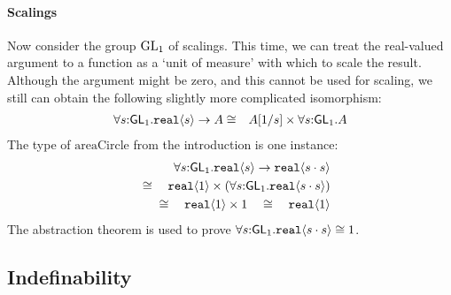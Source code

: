 \paragraph{Scalings}
Now consider the group $\mathrm{GL}_1$ of scalings. This time, we can treat
the real-valued argument to a function as a `unit of measure' with
which to scale the result. 
Although the argument might be zero, and this cannot be used for scaling,
we still can obtain the following slightly more complicated
isomorphism:
\begin{eqnarray*}
\forall s\mathord:\mathsf{GL}_1.\textup{\texttt{real}}\langle s \rangle\to A
& \cong &
A[1/s]\times \forall s\mathord:\mathsf{GL}_1.A
\end{eqnarray*}
The type of $\mathrm{areaCircle}$ from the introduction is one instance:
\begin{eqnarray*}
\forall s\mathord:\mathsf{GL}_1.\textup{\texttt{real}}\langle s \rangle\to\textup{\texttt{real}}\langle s\cdot
  s \rangle\\ \quad\cong\quad \textup{\texttt{real}}\langle 1 \rangle\times(\forall
s\mathord:\mathsf{GL}_1.\textup{\texttt{real}}\langle s\cdot s \rangle)\\ \quad\cong\quad
\textup{\texttt{real}}\langle 1 \rangle\times 1\quad\cong\quad \textup{\texttt{real}}\langle 1 \rangle
\end{eqnarray*}
The abstraction theorem is used to prove
$\forall s\mathord:\mathsf{GL}_1.\textup{\texttt{real}}\langle s\cdot s \rangle\cong 1$.


\subsection{Indefinability}



